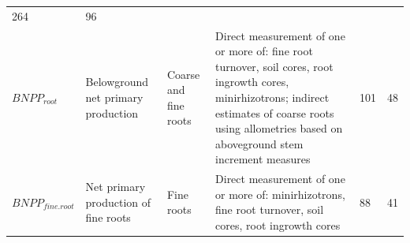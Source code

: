 \documentclass[]{article}
\begin{document}
\begin{longtable}[]{@{}llllll@{}}
\begin{minipage}[t]{0.07\columnwidth}
264\strut
\end{minipage} & \begin{minipage}[t]{0.07\columnwidth}\raggedright\strut
96\strut
\end{minipage}\tabularnewline
\begin{minipage}[t]{0.14\columnwidth}\raggedright\strut
\(BNPP_{root}\)\strut
\end{minipage} & \begin{minipage}[t]{0.19\columnwidth}\raggedright\strut
Belowground net primary production\strut
\end{minipage} & \begin{minipage}[t]{0.13\columnwidth}\raggedright\strut
Coarse and fine roots\strut
\end{minipage} & \begin{minipage}[t]{0.23\columnwidth}\raggedright\strut
Direct measurement of one or more of: fine root turnover, soil cores,
root ingrowth cores, minirhizotrons; indirect estimates of coarse roots
using allometries based on aboveground stem increment measures\strut
\end{minipage} & \begin{minipage}[t]{0.07\columnwidth}\raggedright\strut
101\strut
\end{minipage} & \begin{minipage}[t]{0.07\columnwidth}\raggedright\strut
48\strut
\end{minipage}\tabularnewline
\begin{minipage}[t]{0.14\columnwidth}\raggedright\strut
\(BNPP_{fine.root}\)\strut
\end{minipage} & \begin{minipage}[t]{0.19\columnwidth}\raggedright\strut
Net primary production of fine roots\strut
\end{minipage} & \begin{minipage}[t]{0.13\columnwidth}\raggedright\strut
Fine roots\strut
\end{minipage} & \begin{minipage}[t]{0.23\columnwidth}\raggedright\strut
Direct measurement of one or more of: minirhizotrons, fine root
turnover, soil cores, root ingrowth cores\strut
\end{minipage} & \begin{minipage}[t]{0.07\columnwidth}\raggedright\strut
88\strut
\end{minipage} & \begin{minipage}[t]{0.07\columnwidth}\raggedright\strut
41\strut
\end{minipage}\tabularnewline

\end{longtable}
\end{document}
